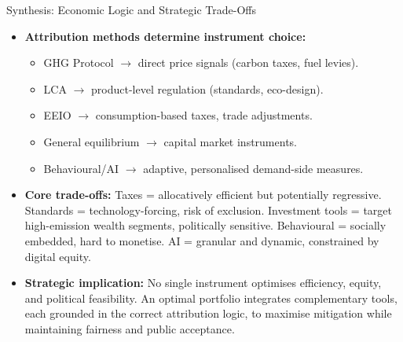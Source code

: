 \documentclass{beamer}
\begin{document}
\begin{frame}{Synthesis: Economic Logic and Strategic Trade-Offs}
\footnotesize
\begin{itemize}
  \item \textbf{Attribution methods determine instrument choice:}  
    \begin{itemize}
      \item GHG Protocol $\rightarrow$ direct price signals (carbon taxes, fuel levies).
      \item LCA $\rightarrow$ product-level regulation (standards, eco-design).
      \item EEIO $\rightarrow$ consumption-based taxes, trade adjustments.
      \item General equilibrium $\rightarrow$ capital market instruments.
      \item Behavioural/AI $\rightarrow$ adaptive, personalised demand-side measures.
    \end{itemize}
  \item \textbf{Core trade-offs:}  
    Taxes = allocatively efficient but potentially regressive.  
    Standards = technology-forcing, risk of exclusion.  
    Investment tools = target high-emission wealth segments, politically sensitive.  
    Behavioural = socially embedded, hard to monetise.  
    AI = granular and dynamic, constrained by digital equity.
  \item \textbf{Strategic implication:}  
    No single instrument optimises efficiency, equity, and political feasibility.  
    An optimal portfolio integrates complementary tools, each grounded in the correct attribution logic, to maximise mitigation while maintaining fairness and public acceptance.
\end{itemize}
\end{frame}
\end{document}
